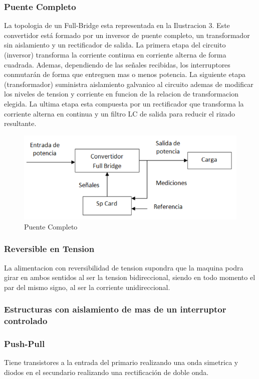 \documentclass[11pt]{article}
\begin{document}
\subsubsection{Puente Completo}
La topologia de un Full-Bridge esta representada en la Ilustracion 3. Este convertidor está formado  por  un  inversor  de  puente  completo,  un  transformador  sin  aislamiento  y  un rectificador de salida. La primera etapa del circuito (inversor) transforma la corriente continua en corriente alterna de forma cuadrada. Ademas, dependiendo de las señales recibidas, los interruptores conmutarán de forma que entreguen mas o menos potencia. La siguiente etapa (transformador) suministra aislamiento galvanico al circuito ademas de modificar los niveles de tension y corriente en funcion de la relacion de transformacion elegida. La ultima etapa esta compuesta por un rectificador que transforma la corriente alterna en continua y un filtro LC de salida para reducir el rizado resultante.
\begin{figure}[htp]
\centering
\includegraphics[scale=0.40]{Puente Completo.png}
\caption{Puente Completo }
\label{}
\end{figure}
\subsubsection{Reversible en Tension}
La alimentacion con reversibilidad de tension supondra que la maquina podra girar en ambos sentidos al ser la tension bidireccional, siendo en todo momento el par del mismo signo, al ser la corriente unidireccional.
\subsubsection{Estructuras con aislamiento de mas de un interruptor controlado}
\subsubsection{Push-Pull}
Tiene transistores a la entrada del primario realizando una onda simetrica y diodos en el secundario realizando una rectificación de doble onda.
\end{document}
